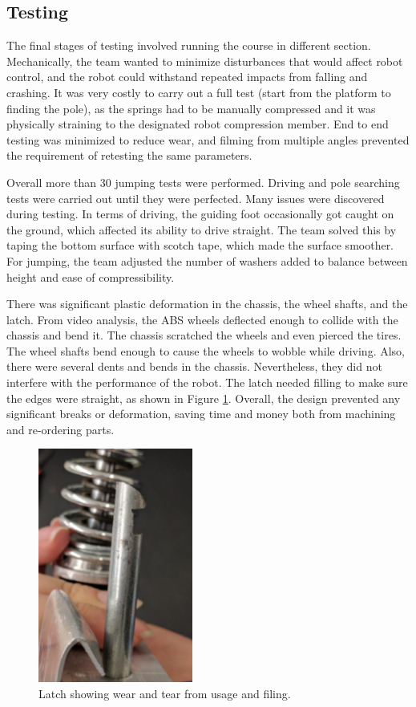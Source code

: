 \documentclass[ece]{uw-wkrpt}
\begin{document}
\subsection{Testing}

The final stages of testing involved running the course in different section. Mechanically, the team wanted to minimize disturbances that would affect robot control, and the robot could withstand repeated impacts from falling and crashing. It was very costly to carry out a full test (start from the platform to finding the pole), as the springs had to be manually compressed and it was physically straining to the designated robot compression member. End to end testing was minimized to reduce wear, and filming from multiple angles prevented the requirement of retesting the same parameters. 

Overall more than 30 jumping tests were performed. Driving and pole searching tests were carried out until they were perfected. Many issues were discovered during testing. In terms of driving, the guiding foot occasionally got caught on the ground, which affected its ability to drive straight. The team solved this by taping the bottom surface with scotch tape, which made the surface smoother. For jumping, the team adjusted the number of washers added to balance between height and ease of compressibility. 

There was significant plastic deformation in the chassis, the wheel shafts, and the latch. From video analysis, the ABS wheels deflected enough to collide with the chassis and bend it. The chassis scratched the wheels and even pierced the tires. The wheel shafts bend enough to cause the wheels to wobble while driving. Also, there were several dents and bends in the chassis. Nevertheless, they did not interfere with the performance of the robot. The latch needed filling to make sure the edges were straight, as shown in Figure \ref{fig:mech13}. Overall, the design prevented any significant breaks or deformation, saving time and money both from machining and re-ordering parts.

\begin{figure}
    \centering
    \includegraphics[width=2.0in]{res/mech13}
    \caption[Latch showing wear and tear from usage and filing]
          {Latch showing wear and tear from usage and filing.}
    \label{fig:mech13}
\end{figure}
\end{document}
